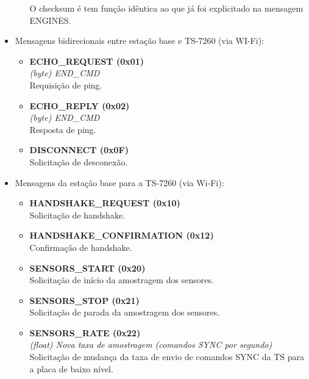 \begin{itemize}
\begin{itemize}
	  O checksum é tem função idêntica ao que já foi explicitado na mensagem ENGINES.
	  
	  
	\end{itemize}

  \item Mensagens bidirecionais entre estação base e TS-7260 (via WI-Fi):

    \begin{itemize}
      \item \textbf{ECHO\_REQUEST (0x01)}\\
      \textit{(byte) END\_CMD}\\
	Requisição de ping.
      \item \textbf{ECHO\_REPLY (0x02)}\\
      \textit{(byte) END\_CMD}\\
	Resposta de ping.
      \item \textbf{DISCONNECT (0x0F)} \\
	Solicitação de desconexão.
    \end{itemize}

  \item Mensagens da estação base para a TS-7260 (via Wi-Fi):

    \begin{itemize}
      \item \textbf{HANDSHAKE\_REQUEST (0x10)}\\
	Solicitação de handshake.

      \item \textbf{HANDSHAKE\_CONFIRMATION (0x12)}\\
	Confirmação de handshake.

      \item \textbf{SENSORS\_START (0x20)}\\
	Solicitação de início da amostragem dos sensores.

      \item \textbf{SENSORS\_STOP (0x21)}\\
	Solicitação de parada da amostragem dos sensores.

      \item \textbf{SENSORS\_RATE (0x22)} \\
	\textit{(float) Nova taxa de amostragem (comandos SYNC por segundo)}\\
	Solicitação de mudança da taxa de envio de comandos SYNC da TS para a placa de baixo nível.



\end{itemize}
\end{itemize}
